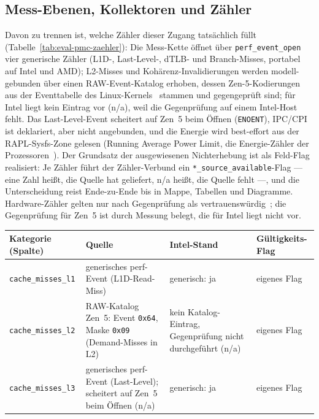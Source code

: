 \begin{nurkurz}
\subsection{Mess-Ebenen, Kollektoren und Zähler}\label{sec:eval-counters}
Davon zu trennen ist, welche Zähler dieser Zugang tatsächlich füllt (Tabelle~\ref{tab:eval-pmc-zaehler}):
Die Mess-Kette öffnet über \texttt{perf\_event\_open}~\cite{linux_perf_event_open,demelo2010perf} vier
generische Zähler (L1D-, Last-Level-, dTLB- und Branch-Misses, portabel auf Intel und AMD); L2-Misses und
Kohärenz-Invalidierungen werden modell-gebunden über einen RAW-Event-Katalog erhoben, dessen
Zen-5-Kodierungen aus der Eventtabelle des Linux-Kernels~\cite{linux_perf_amdzen5} stammen und
gegengeprüft sind; für Intel liegt kein Eintrag vor (n/a), weil die Gegenprüfung auf einem Intel-Host
fehlt. Das Last-Level-Event scheitert auf Zen~5 beim Öffnen (\texttt{ENOENT}), IPC/CPI ist deklariert,
aber nicht angebunden, und die Energie wird best-effort aus der RAPL-Sysfs-Zone gelesen (Running Average
Power Limit, die Energie-Zähler der Prozessoren~\cite{david2010rapl,khan2018rapl}). Der Grundsatz der
ausgewiesenen Nichterhebung ist als Feld-Flag realisiert: Je Zähler führt der Zähler-Verbund ein
\texttt{*\_source\_available}-Flag --- eine Zahl heißt, die Quelle hat geliefert, n/a heißt, die Quelle
fehlt ---, und die Unterscheidung reist Ende-zu-Ende bis in Mappe, Tabellen und Diagramme. Hardware-Zähler
gelten nur nach Gegenprüfung als vertrauenswürdig~\cite{weaver2008counters}; die Gegenprüfung für Zen~5 ist
durch Messung belegt, die für Intel liegt nicht vor.
\begin{table}[htbp]\centering\footnotesize
\begin{tabular}{@{}l>{\raggedright\arraybackslash}p{4.6cm}>{\raggedright\arraybackslash}p{3.2cm}>{\raggedright\arraybackslash}p{2.3cm}@{}}
\toprule
Kategorie (Spalte) & Quelle & Intel-Stand & Gültigkeits-Flag \\
\midrule
\texttt{cache\_misses\_l1} & generisches perf-Event (L1D-Read-Miss) & generisch: ja & eigenes Flag \\
\texttt{cache\_misses\_l2} & RAW-Katalog Zen~5: Event \texttt{0x64}, Maske \texttt{0x09} (Demand-Misses in L2) & kein Katalog-Eintrag, Gegenprüfung nicht durchgeführt (n/a) & eigenes Flag \\ %
\texttt{cache\_misses\_l3} & generisches perf-Event (Last-Level); scheitert auf Zen~5 beim Öffnen (n/a) & generisch: ja & eigenes Flag \\

\end{tabular}
\end{table}
\end{nurkurz}
